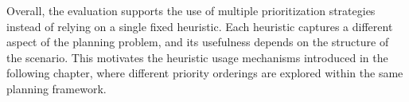 Overall, the evaluation supports the use of multiple prioritization strategies instead of relying on a
single fixed heuristic. Each heuristic captures a different aspect of the planning problem, and its
usefulness depends on the structure of the scenario. This motivates the heuristic usage mechanisms
introduced in the following chapter, where different priority orderings are explored within the same
planning framework.

